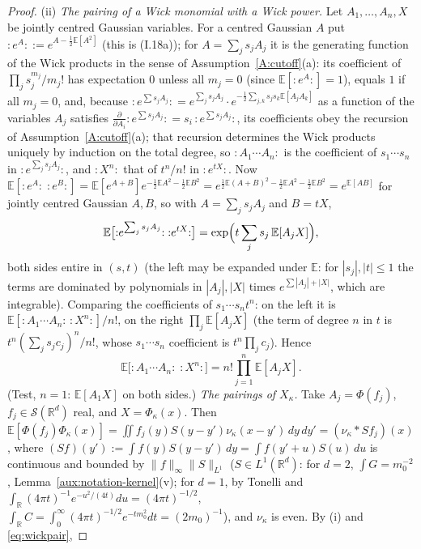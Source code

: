 \documentclass[11pt,a4paper]{article}
\theoremstyle{plain}
\theoremstyle{definition}
\theoremstyle{plain}
\theoremstyle{definition}
\newcommand{\R}{\mathbb{R}}
\newcommand{\E}{\mathbb{E}}
\begin{document}
\begin{proof}
(ii) \emph{The pairing of a Wick monomial with a Wick power.}  Let $A_1,\dots,A_n,X$ be
jointly centred Gaussian variables.  For a centred Gaussian $A$ put ${:}e^{A}{:}:=
e^{A-\frac12\E[A^2]}$ (this is (I.18a)); for $A=\sum_js_jA_j$ it is the generating function of
the Wick products in the sense of Assumption~\ref{A:cutoff}(a): its coefficient of $\prod_js_j^{m_j}/m_j!$
has expectation $0$ unless all $m_j=0$ (since $\E[{:}e^A{:}]=1$), equals $1$ if all $m_j=0$,
and, because ${:}e^{\sum s_jA_j}{:}=e^{\sum_js_jA_j}\cdot e^{-\frac12\sum_{j,k}s_js_k\E[A_jA_k]}$
as a function of the variables $A_j$ satisfies $\frac{\partial}{\partial A_i}{:}e^{\sum s_jA_j}
{:}=s_i\,{:}e^{\sum s_jA_j}{:}$, its coefficients obey the recursion of
Assumption~\ref{A:cutoff}(a); that recursion determines the Wick products uniquely by
induction on the total degree, so ${:}A_1\cdots A_n{:}$ is the coefficient of $s_1\cdots s_n$ in
${:}e^{\sum_js_jA_j}{:}$, and ${:}X^n{:}$ that of $t^n/n!$ in ${:}e^{tX}{:}$.  Now
$\E[{:}e^{A}{:}\;{:}e^{B}{:}]=\E[e^{A+B}]e^{-\frac12\E A^2-\frac12\E B^2}=e^{\frac12\E(A+B)^2-\frac12
\E A^2-\frac12\E B^2}=e^{\E[AB]}$ for jointly centred Gaussian $A,B$, so with $A=\sum_js_jA_j$ and
$B=tX$,
\[
 \E\bigl[{:}e^{\sum_js_jA_j}{:}\;{:}e^{tX}{:}\bigr]=\exp\Bigl(t\sum_js_j\,\E[A_jX]\Bigr),
\]
both sides entire in $(s,t)$ (the left may be expanded under $\E$: for $|s_j|,|t|\le1$ the
terms are dominated by polynomials in $|A_j|,|X|$ times $e^{\sum|A_j|+|X|}$, which are
integrable).  Comparing the coefficients of $s_1\cdots s_nt^n$: on the left it is
$\E[{:}A_1\cdots A_n{:}\,{:}X^n{:}]/n!$, on the right $\prod_j\E[A_jX]$ (the term of degree $n$ in
$t$ is $t^n(\sum_js_jc_j)^n/n!$, whose $s_1\cdots s_n$ coefficient is $t^n\prod_jc_j$).  Hence
\begin{equation}
 \E\bigl[{:}A_1\cdots A_n{:}\;{:}X^n{:}\bigr]=n!\prod_{j=1}^n\E[A_jX] .
 \tag{W.4}\label{eq:wickpair}
\end{equation}
(Test, $n=1$: $\E[A_1X]$ on both sides.)  \emph{The pairings of $X_\kappa$.}  Take
$A_j=\Phi(f_j)$, $f_j\in\mathcal S(\R^d)$ real, and $X=\Phi_\kappa(x)$.  Then
$\E[\Phi(f_j)\Phi_\kappa(x)]=\iint f_j(y)S(y-y')\nu_\kappa(x-y')\,dy\,dy'=(\nu_\kappa*Sf_j)(x)$,
where $(Sf)(y'):=\int f(y)S(y-y')\,dy=\int f(y'+u)S(u)\,du$ is continuous and bounded by
$\|f\|_\infty\|S\|_{L^1}$ ($S\in L^1(\R^d)$: for $d=2$, $\int G=m_0^{-2}$,
Lemma~\ref{aux:notation-kernel}(v); for $d=1$, by Tonelli and $\int_\R(4\pi t)^{-1}e^{-u^2/(4t)}du
=(4\pi t)^{-1/2}$, $\int_\R C=\int_0^\infty(4\pi t)^{-1/2}e^{-tm_0^2}dt=(2m_0)^{-1}$), and
$\nu_\kappa$ is even.  By (i) and \eqref{eq:wickpair},

\end{proof}
\end{document}
